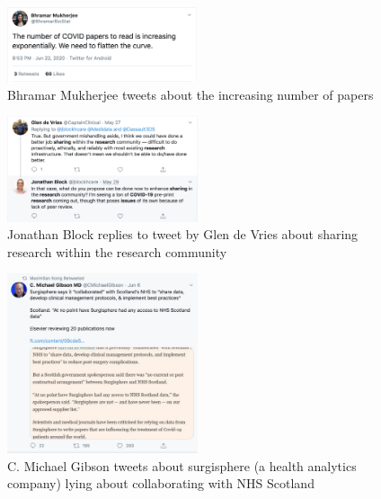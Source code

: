 \documentclass[acmsmall,authordraft]{acmart}
\begin{document}
\begin{figure}
  \includegraphics[width=0.5\textwidth]{Pictures/Appendix_Tweets/bhramar mukherjee tweet.png}
  \caption{Bhramar Mukherjee tweets about the increasing number of papers}
  \label{bhramar_mukherjee_tweet}
\end{figure}

\begin{figure}
  \includegraphics[width=0.5\textwidth]{Pictures/Appendix_Tweets/block and vries tweet.png}
  \caption{Jonathan Block replies to tweet by Glen de Vries about sharing research within the research community}
  \label{block_vries_tweet}
\end{figure}

\begin{figure}
  \includegraphics[width=0.5\textwidth]{Pictures/Appendix_Tweets/c michael gibson tweet.png}
  \caption{C. Michael Gibson tweets about surgisphere (a health analytics company) lying about collaborating with NHS Scotland}
  \label{c_michael_gibson_tweet}
\end{figure}
\end{document}
